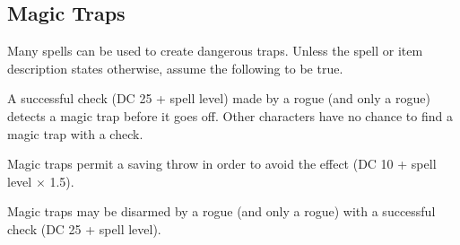 \subsection{Magic Traps}
Many spells can be used to create dangerous traps. Unless the spell or item description states otherwise, assume the following to be true.

\begin{itemize*}
\item A successful  check (DC 25 + spell level) made by a rogue (and only a rogue) detects a magic trap before it goes off. Other characters have no chance to find a magic trap with a  check.
\item Magic traps permit a saving throw in order to avoid the effect (DC 10 + spell level $\times$ 1.5).
\item Magic traps may be disarmed by a rogue (and only a rogue) with a successful  check (DC 25 + spell level).
\end{itemize*}




